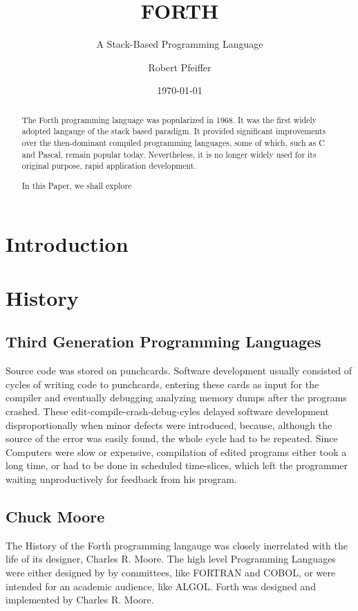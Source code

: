 \documentclass{llncs}
\title{FORTH}
\subtitle{A Stack-Based Programming Language}
\author{Robert Pfeiffer}
\date{\today}
\institute{History of Programming Languages, Software Architecture Group, Hasso-Plattner-Institut, Universität Potsdam, D-14482 Potsdam, Germany,\\
\email{robert.pfeiffer@student.hpi.uni-potsdam.de}}
\begin{document}
\maketitle
\begin{abstract}
 The Forth programming language was popularized in 1968. It was the first widely adopted langauge of the stack based paradigm. It provided significant improvements over the then-dominant compiled programming languages, some of which, such as C and Pascal, remain popular today. Nevertheless, it is no longer widely used for its original purpose, rapid application development.

In this Paper, we shall explore 
\end{abstract}
 \section{Introduction}

 \section{History}
  
 \subsection{Third Generation Programming Languages}

Source code was stored on punchcards. Software development usually consisted of cycles of writing code to punchcards, entering these cards as input for the compiler and eventually debugging analyzing memory dumps after the programs crashed. These edit-compile-crash-debug-cyles delayed software development disproportionally when minor defects were introduced, because, although the source of the error was easily found, the whole cycle had to be repeated. Since Computers were slow or expensive, compilation of edited programs either took a long time, or had to be done in scheduled time-slices, which left the programmer waiting unproductively for feedback from his program.

\subsection{Chuck Moore}

The History of the Forth programming langauge was closely inerrelated with the life of its designer, Charles R. Moore. The high level Programming Languages were either designed by by committees, like FORTRAN and COBOL, or were intended for an academic audience, like ALGOL.
Forth was designed and implemented by Charles R. Moore.
\end{document}
